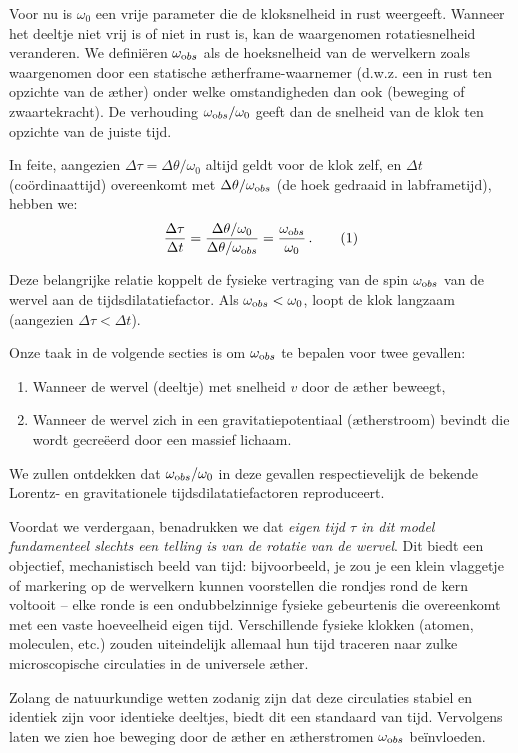 Voor nu is $\omega_0$ een vrije parameter die de kloksnelheid in rust weergeeft. Wanneer het deeltje niet vrij is of niet in rust is, kan de waargenomen rotatiesnelheid veranderen. We definiëren $\omega_{\textrm obs}$ als de hoeksnelheid van de wervelkern zoals waargenomen door een statische ætherframe-waarnemer (d.w.z. een in rust ten opzichte van de æther) onder welke omstandigheden dan ook (beweging of zwaartekracht). De verhouding $\omega_{\textrm obs}/\omega_0$ geeft dan de snelheid van de klok ten opzichte van de juiste tijd.

In feite, aangezien $\Delta \tau = \Delta \theta / \omega_0$ altijd geldt voor de klok zelf, en $\Delta t$ (coördinaattijd) overeenkomt met $\Delta \theta / \omega_{\textrm obs}$ (de hoek gedraaid in labframetijd), hebben we:
\[
    \frac{\Delta \tau}{\Delta t} = \frac{\Delta \theta / \omega_0}{\Delta \theta / \omega_{\textrm obs}} = \frac{\omega_{\textrm obs}}{\omega_0} \,. \tag{1}
\]

Deze belangrijke relatie koppelt de fysieke vertraging van de spin $\omega_{\textrm obs}$ van de wervel aan de tijdsdilatatiefactor. Als $\omega_{\textrm obs} < \omega_0$, loopt de klok langzaam (aangezien $\Delta \tau < \Delta t$).

Onze taak in de volgende secties is om $\omega_{\textrm obs}$ te bepalen voor twee gevallen:
\begin{enumerate}
    \item Wanneer de wervel (deeltje) met snelheid $v$ door de æther beweegt,
    \item Wanneer de wervel zich in een gravitatiepotentiaal (ætherstroom) bevindt die wordt gecreëerd door een massief lichaam.
\end{enumerate}
We zullen ontdekken dat $\omega_{\textrm obs}/\omega_0$ in deze gevallen respectievelijk de bekende Lorentz- en gravitationele tijdsdilatatiefactoren reproduceert.

Voordat we verdergaan, benadrukken we dat \emph{eigen tijd $\tau$ in dit model fundamenteel slechts een telling is van de rotatie van de wervel}. Dit biedt een objectief, mechanistisch beeld van tijd: bijvoorbeeld, je zou je een klein vlaggetje of markering op de wervelkern kunnen voorstellen die rondjes rond de kern voltooit – elke ronde is een ondubbelzinnige fysieke gebeurtenis die overeenkomt met een vaste hoeveelheid eigen tijd. Verschillende fysieke klokken (atomen, moleculen, etc.) zouden uiteindelijk allemaal hun tijd traceren naar zulke microscopische circulaties in de universele æther.

Zolang de natuurkundige wetten zodanig zijn dat deze circulaties stabiel en identiek zijn voor identieke deeltjes, biedt dit een standaard van tijd. Vervolgens laten we zien hoe beweging door de æther en ætherstromen $\omega_{\textrm obs}$ beïnvloeden.